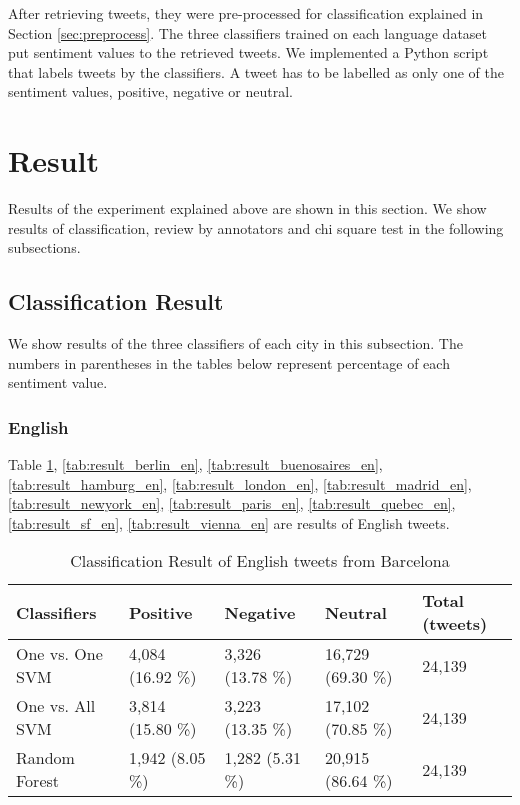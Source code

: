 After retrieving tweets, they were pre-processed for classification explained in Section \ref{sec:preprocess}.
The three classifiers trained on each language dataset put sentiment values to the retrieved tweets.
We implemented a Python script that labels tweets by the classifiers.
A tweet has to be labelled as only one of the sentiment values, positive, negative or neutral.

\section{Result}\label{sec:result}
Results of the experiment explained above are shown in this section.
We show results of classification, review by annotators and chi square test in the following subsections.
\subsection{Classification Result}
We show results of the three classifiers of each city in this subsection.
The numbers in parentheses in the tables below represent percentage of each sentiment value.

\subsubsection{English}
Table \ref{tab:result_barcelona_en}, \ref{tab:result_berlin_en}, \ref{tab:result_buenosaires_en}, \ref{tab:result_hamburg_en}, \ref{tab:result_london_en}, \ref{tab:result_madrid_en}, \ref{tab:result_newyork_en}, \ref{tab:result_paris_en}, \ref{tab:result_quebec_en}, \ref{tab:result_sf_en}, \ref{tab:result_vienna_en} are results of English tweets.
\begin{table}[ht]
	\caption{Classification Result of English tweets from Barcelona}
	\begin{tabular}{|l|p{1.8cm}|p{1.8cm}|p{1.8cm}|p{1.8cm}|} \hline
	Classifiers & Positive & Negative & Neutral & Total (tweets)\\ \hline
	One vs. One SVM & 4,084 (16.92 \%) & 3,326 (13.78 \%) & 16,729 (69.30 \%) & 24,139\\ \hline
	One vs. All SVM & 3,814 (15.80 \%) & 3,223 (13.35 \%) & 17,102 (70.85 \%) & 24,139  \\ \hline
	Random Forest & 1,942 (8.05 \%) & 1,282 (5.31 \%) & 20,915 (86.64 \%) & 24,139 \\ \hline
	\end{tabular}
	\label{tab:result_barcelona_en}
\end{table}

